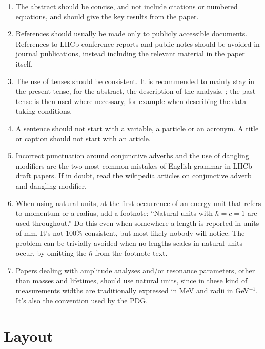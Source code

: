 \begin{enumerate}
\item The abstract should be concise, and not include citations or
  numbered equations, and should give the key results from the paper.

\item References should usually be made only to publicly accessible
  documents. References to LHCb conference reports and public notes
  should be avoided in journal publications, instead including the
  relevant material in the paper itself.

\item The use of tenses should be consistent. It is recommended to
  mainly stay in the present tense, for the abstract, the description
  of the analysis, \etc; the past tense is then used where necessary,
  for example when describing the data taking conditions.

\item A sentence should not start with a variable, a particle or an acronym.
 A title or caption should not start with an article. 

\item Incorrect punctuation around conjunctive adverbs and the use of 
dangling modifiers are the two most common mistakes of English grammar
in LHCb draft papers. If in doubt, read the wikipedia articles on 
conjunctive adverb and dangling modifier.  

\item When using natural units, at the first occurrence of an energy unit
      that refers to momentum or a radius, add a footnote: ``Natural units
      with $\hbar=c=1$ are used throughout.'' Do this even when somewhere
      a length is reported in units of mm. It's not 100\% consistent, but
      most likely nobody will notice. The problem can be trivially avoided
      when no lengths scales in natural units occur, by omitting the 
      $\hbar$ from the footnote text.

\item Papers dealing with amplitude analyses and/or resonance parameters, 
      other than masses and lifetimes, should use natural units,
      since in these kind of measurements widths are traditionally 
      expressed in MeV and radii in GeV$^{-1}$. It's also the convention
      used by the PDG. 

\end{enumerate}

\section{Layout}

